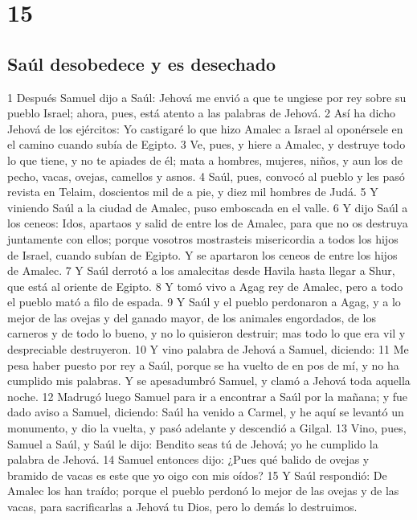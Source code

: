 \chapter{15}

\section*{Saúl desobedece y es desechado}


1 Después Samuel dijo a Saúl: Jehová me envió a que te ungiese por rey sobre su pueblo Israel; ahora, pues, está atento a las palabras de Jehová.
2 Así ha dicho Jehová de los ejércitos: Yo castigaré lo que hizo Amalec a Israel al oponérsele en el camino cuando subía de Egipto. 
3 Ve, pues, y hiere a Amalec, y destruye todo lo que tiene, y no te apiades de él; mata a hombres, mujeres, niños, y aun los de pecho, vacas, ovejas, camellos y asnos.
4 Saúl, pues, convocó al pueblo y les pasó revista en Telaim, doscientos mil de a pie, y diez mil hombres de Judá.
5 Y viniendo Saúl a la ciudad de Amalec, puso emboscada en el valle.
6 Y dijo Saúl a los ceneos: Idos, apartaos y salid de entre los de Amalec, para que no os destruya juntamente con ellos; porque vosotros mostrasteis misericordia a todos los hijos de Israel, cuando subían de Egipto. Y se apartaron los ceneos de entre los hijos de Amalec.
7 Y Saúl derrotó a los amalecitas desde Havila hasta llegar a Shur, que está al oriente de Egipto.
8 Y tomó vivo a Agag rey de Amalec, pero a todo el pueblo mató a filo de espada.
9 Y Saúl y el pueblo perdonaron a Agag, y a lo mejor de las ovejas y del ganado mayor, de los animales engordados, de los carneros y de todo lo bueno, y no lo quisieron destruir; mas todo lo que era vil y despreciable destruyeron.
10 Y vino palabra de Jehová a Samuel, diciendo:
11 Me pesa haber puesto por rey a Saúl, porque se ha vuelto de en pos de mí, y no ha cumplido mis palabras. Y se apesadumbró Samuel, y clamó a Jehová toda aquella noche.
12 Madrugó luego Samuel para ir a encontrar a Saúl por la mañana; y fue dado aviso a Samuel, diciendo: Saúl ha venido a Carmel, y he aquí se levantó un monumento, y dio la vuelta, y pasó adelante y descendió a Gilgal.
13 Vino, pues, Samuel a Saúl, y Saúl le dijo: Bendito seas tú de Jehová; yo he cumplido la palabra de Jehová.
14 Samuel entonces dijo: ¿Pues qué balido de ovejas y bramido de vacas es este que yo oigo con mis oídos?
15 Y Saúl respondió: De Amalec los han traído; porque el pueblo perdonó lo mejor de las ovejas y de las vacas, para sacrificarlas a Jehová tu Dios, pero lo demás lo destruimos.
